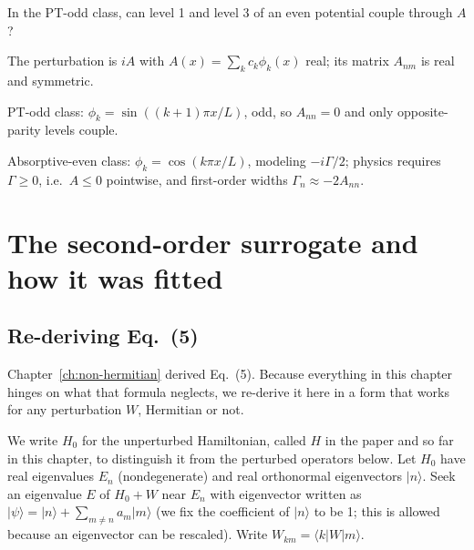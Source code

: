 \begin{checkpoint}
In the PT-odd class, can level 1 and level 3 of an even potential couple through $A$?
\end{checkpoint}

\begin{keyideas}
\item The perturbation is $iA$ with $A(x)=\sum_kc_k\phi_k(x)$ real; its matrix $A_{nm}$ is real and symmetric.
\item PT-odd class: $\phi_k=\sin((k+1)\pi x/L)$, odd, so $A_{nn}=0$ and only opposite-parity levels couple.
\item Absorptive-even class: $\phi_k=\cos(k\pi x/L)$, modeling $-i\Gamma/2$; physics requires $\Gamma\ge0$, i.e.\ $A\le0$ pointwise, and first-order widths $\Gamma_n\approx-2A_{nn}$.
\end{keyideas}

\section{The second-order surrogate and how it was fitted}\label{sec:paper-spurious-floor-surrogate}

\subsection{Re-deriving Eq.~(5)}

Chapter~\ref{ch:non-hermitian} derived Eq.~(5). Because everything in this chapter hinges on what that formula neglects, we re-derive it here in a form that works for any perturbation $W$, Hermitian or not.

We write $H_0$ for the unperturbed Hamiltonian, called $H$ in the paper and so far in this chapter, to distinguish it from the perturbed operators below. Let $H_0$ have real eigenvalues $E_n$ (nondegenerate) and real orthonormal eigenvectors $|n\rangle$. Seek an eigenvalue $E$ of $H_0+W$ near $E_n$ with eigenvector written as $|\psi\rangle=|n\rangle+\sum_{m\ne n}a_m|m\rangle$ (we fix the coefficient of $|n\rangle$ to be 1; this is allowed because an eigenvector can be rescaled). Write $W_{km}=\langle k|W|m\rangle$.

